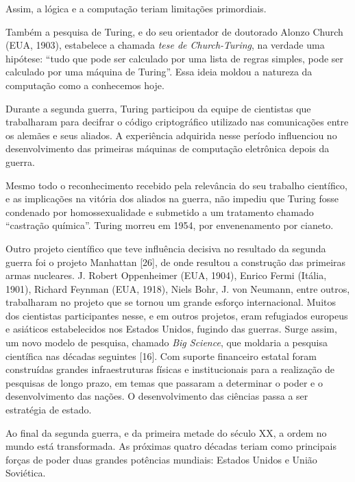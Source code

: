 \documentclass{hipatia}
\begin{document}
Assim, a lógica e a computação teriam limitações primordiais. 

Também a pesquisa de Turing, e do seu orientador de doutorado Alonzo Church (EUA, 1903), estabelece a chamada \textit{tese de Church-Turing}, na verdade uma hipótese:  ``tudo que pode ser calculado por uma lista de regras simples, pode ser calculado por uma máquina de Turing''. Essa ideia moldou a natureza da computação como a conhecemos hoje.

Durante a segunda guerra, Turing participou da equipe de cientistas que trabalharam para decifrar o código criptográfico utilizado nas comunicações entre os alemães e seus aliados. A experiência adquirida nesse período influenciou no desenvolvimento das primeiras máquinas de computação eletrônica depois da guerra.  

Mesmo todo o reconhecimento recebido pela relevância do seu trabalho científico, e as implicações na vitória dos aliados na guerra, não impediu que Turing fosse condenado por homossexualidade e submetido a um tratamento chamado ``castração química''. Turing morreu em 1954, por envenenamento por cianeto.

Outro projeto científico que teve influência decisiva no resultado da segunda guerra foi o projeto Manhattan [26], de onde resultou a construção das primeiras armas nucleares. J. Robert Oppenheimer (EUA, 1904), Enrico Fermi (Itália, 1901), Richard Feynman (EUA, 1918), Niels Bohr, J. von Neumann, entre outros, trabalharam no projeto que se tornou um grande esforço internacional. Muitos dos cientistas participantes nesse, e em outros projetos, eram refugiados europeus e asiáticos estabelecidos nos Estados Unidos, fugindo das guerras. Surge assim, um novo modelo de pesquisa, chamado \textit{Big Science}, que moldaria a pesquisa científica nas décadas seguintes [16]. Com suporte financeiro estatal foram construídas grandes infraestruturas físicas e institucionais para a realização de pesquisas de longo prazo, em temas que passaram a determinar o poder e o desenvolvimento das nações. O desenvolvimento das ciências passa a ser estratégia de estado.

Ao final da segunda guerra, e da primeira metade do século XX, a ordem no mundo está transformada. As próximas quatro décadas teriam como principais forças de poder duas grandes potências mundiais: Estados Unidos e União Soviética.
\end{document}
